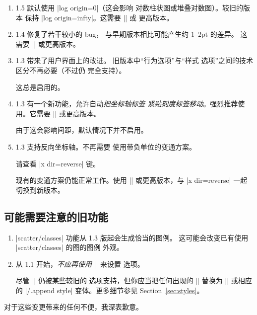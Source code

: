 \begin{enumerate}
        若没有此兼容设置，圆和椭圆将像早期版本那样使用
        \pgfname{} 的底层画布单位。
    \item \PGFPlots{} 1.5 默认使用 |log origin=0|（这会影响
        对数柱状图或堆叠对数图）。较旧的版本
        保持 |log origin=infty|。这需要 |\pgfplotsset{compat=1.5}| 或
        更高版本。
    \item \PGFPlots{} 1.4 修复了若干较小的 bug，
        与早期版本相比可能产生约 $1$--$2\text{pt}$ 的差异。
        这需要 |\pgfplotsset{compat=1.4}| 或更高版本。
    \item \PGFPlots{} 1.3 带来了用户界面上的改进。
        旧版本中“行为选项”与“样式
        选项”之间的技术区分不再必要（不过仍
        完全支持）。

        这总是启用的。
    \item \PGFPlots{} 1.3 有一个新功能，允许自动\emph{把坐标轴标签
        紧贴刻度标签移动}。强烈推荐使用。它需要
        |\pgfplotsset{compat=1.3}| 或更高版本。

        由于这会影响间距，默认情况下并不启用。
    \item \PGFPlots{} 1.3 支持反向坐标轴。不再需要
        使用带负单位的变通方案。

        请查看 |x dir=reverse| 键。

        现有的变通方案仍能正常工作。使用
        |\pgfplotsset{compat=1.3}| 或更高版本，与 |x dir=reverse| 一起
        切换到新版本。
\end{enumerate}


\subsection{可能需要注意的旧功能}

\begin{enumerate}
    \item |scatter/classes| 功能从 1.3 版起会生成恰当的图例。
        这可能会改变已有使用 |scatter/classes| 的图的图例
        外观。
    \item 从 \PGFPlots{} 1.1 开始，\emph{不应再使用} |\tikzstyle|
        来设置 \PGFPlots{} 选项。

        尽管 |\tikzstyle| 仍被某些较旧的 \PGFPlots{}
        选项支持，但你应当把任何出现的 |\tikzstyle| 替换为
        ||
        或相应的 |/.append style| 变体。更多细节参见
        Section~\ref{sec:styles}。
\end{enumerate}
%
对于这些变更带来的任何不便，我深表歉意。

